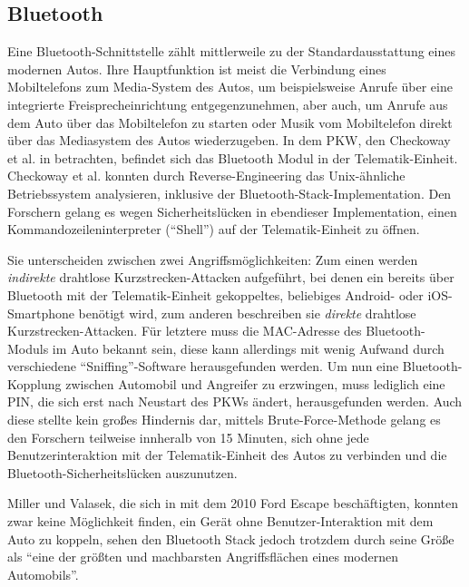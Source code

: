 \documentclass[
    fontsize=12pt,
    headings=small,
    parskip=half,           %
    bibliography=totoc,
    numbers=noenddot,       %
    open=any,               %
    ]{scrreprt}
\begin{document}
\subsection{Bluetooth}
Eine Bluetooth-Schnittstelle zählt mittlerweile zu der Standardausstattung eines modernen Autos. Ihre Hauptfunktion ist meist die Verbindung eines Mobiltelefons zum Media-System des Autos, um beispielsweise Anrufe über eine integrierte Freisprecheinrichtung entgegenzunehmen, aber auch, um Anrufe aus dem Auto über das Mobiltelefon zu starten oder Musik vom Mobiltelefon direkt über das Mediasystem des Autos wiederzugeben.
In dem PKW, den Checkoway et al. in \cite{CMK11} betrachten, befindet sich das Bluetooth Modul in der Telematik-Einheit. Checkoway et al. konnten durch Reverse-Engineering das Unix-ähnliche Betriebssystem analysieren, inklusive der Bluetooth-Stack-Implementation. Den Forschern gelang es wegen Sicherheitslücken in ebendieser Implementation, einen Kommandozeileninterpreter ("`Shell"') auf der Telematik-Einheit zu öffnen. \par
Sie unterscheiden zwischen zwei Angriffsmöglichkeiten: Zum einen werden \textit{indirekte} drahtlose Kurzstrecken-Attacken aufgeführt, bei denen ein bereits über Bluetooth mit der Telematik-Einheit gekoppeltes, beliebiges Android- oder iOS-Smartphone benötigt wird, zum anderen beschreiben sie \textit{direkte} drahtlose Kurzstrecken-Attacken. Für letztere muss die MAC-Adresse des Bluetooth-Moduls im Auto bekannt sein, diese kann allerdings mit wenig Aufwand durch verschiedene "`Sniffing"'-Software herausgefunden werden. Um nun eine Bluetooth-Kopplung zwischen Automobil und Angreifer zu erzwingen, muss lediglich eine PIN, die sich erst nach Neustart des PKWs ändert, herausgefunden werden. Auch diese stellte kein großes Hindernis dar, mittels Brute-Force-Methode gelang es den Forschern teilweise innheralb von 15 Minuten, sich ohne jede Benutzerinteraktion mit der Telematik-Einheit des Autos zu verbinden und die Bluetooth-Sicherheitslücken auszunutzen.\par
Miller und Valasek, die sich in \cite{MiV14} mit dem 2010 Ford Escape beschäftigten, konnten zwar keine Möglichkeit finden, ein Gerät ohne Benutzer-Interaktion mit dem Auto zu koppeln, sehen den Bluetooth Stack jedoch trotzdem durch seine Größe als "`eine der größten und machbarsten Angriffsflächen eines modernen Automobils"'.
\end{document}

